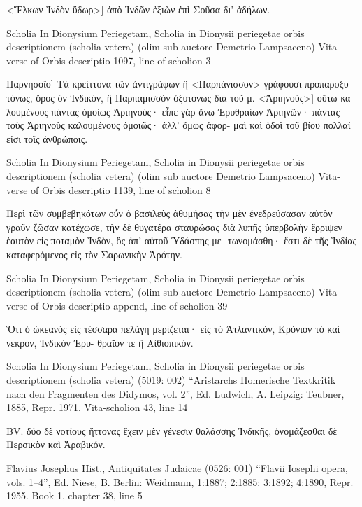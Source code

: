 \documentclass[12pt,letterpaper,twoside,final]{memoir}
\begin{document}
\begin{greek}
<Ἕλκων Ἰνδὸν ὕδωρ>] ἀπὸ Ἰνδῶν ἐξιὼν ἐπὶ 
Σοῦσα δι' ἀδήλων. 



Scholia In Dionysium Periegetam, Scholia in Dionysii periegetae orbis descriptionem (scholia vetera) (olim sub auctore Demetrio Lampsaceno) 
Vita-verse of Orbis descriptio 1097, line of scholion 3

Παρνησοῖο] Τὰ κρείττονα τῶν ἀντιγράφων ἢ 
<Παρπάνισσον> γράφουσι προπαροξυτόνως, ὄρος ὂν 
Ἰνδικὸν, ἢ Παρπαμισσόν ὀξυτόνως διὰ τοῦ μ. 
<Ἀριηνούς>] οὕτω καλουμένους πάντας ὁμοίως 
Ἀριηνούς· εἶπε γὰρ ἄνω Ἐρυθραίων Ἀριηνῶν· πάντας 
τοὺς Ἀριηνοὺς καλουμένους ὁμοιῶς· ἀλλ' ὅμως ἀφορ-
μαὶ καὶ ὁδοὶ τοῦ βίου πολλαί εἰσι τοῖς ἀνθρώποις. 



Scholia In Dionysium Periegetam, Scholia in Dionysii periegetae orbis descriptionem (scholia vetera) (olim sub auctore Demetrio Lampsaceno) 
Vita-verse of Orbis descriptio 1139, line of scholion 8

Περὶ τῶν συμβεβηκότων οὖν ὁ βασιλεὺς ἀθυμήσας τὴν 
μὲν ἐνεδρεύσασαν αὐτὸν γραῦν ζῶσαν κατέχωσε, τὴν 
δὲ θυγατέρα σταυρώσας διὰ λυπῆς ὑπερβολὴν ἔρριψεν 
ἑαυτὸν εἰς ποταμὸν Ἰνδὸν, ὃς ἀπ' αὐτοῦ Ὑδάσπης με-
τωνομάσθη· ἔστι δὲ τῆς Ἰνδίας καταφερόμενος εἰς τὸν 
Σαρωνικὴν Ἀρότην. 



Scholia In Dionysium Periegetam, Scholia in Dionysii periegetae orbis descriptionem (scholia vetera) (olim sub auctore Demetrio Lampsaceno) 
Vita-verse of Orbis descriptio append, line of scholion 39

Ὅτι ὁ ὠκεανὸς εἰς τέσσαρα πελάγη μερίζεται· εἰς 
τὸ Ἀτλαντικὸν, Κρόνιον τὸ καὶ νεκρὸν, Ἰνδικὸν Ἐρυ-
θραῖόν τε ἢ Αἰθιοπικόν. 



Scholia In Dionysium Periegetam, Scholia in Dionysii periegetae orbis descriptionem (scholia vetera) (5019: 002)
“Aristarchs Homerische Textkritik nach den Fragmenten des Didymos, vol. 2”, Ed. Ludwich, A.
Leipzig: Teubner, 1885, Repr. 1971.
Vita-scholion 43, line 14

                                                BV. δύο δὲ νοτίους 
ἥττονας ἔχειν μὲν γένεσιν θαλάσσης Ἰνδικῆς, ὀνομάζεσθαι δὲ 
Περσικὸν καὶ Ἀραβικόν. 



Flavius Josephus Hist., Antiquitates Judaicae (0526: 001)
“Flavii Iosephi opera, vols. 1–4”, Ed. Niese, B.
Berlin: Weidmann, 1:1887; 2:1885: 3:1892; 4:1890, Repr. 1955.
Book 1, chapter 38, line 5


\end{greek}
\end{document}
